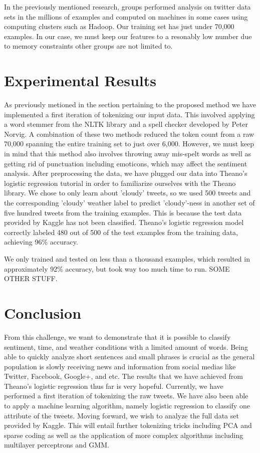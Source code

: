 \documentclass{article}
\begin{document}
In the previously mentioned research, groups performed analysis on twitter data sets in the millions of examples and computed on machines in some cases using computing clusters such as Hadoop. Our training set has just under 70,000 examples. In our case, we must keep our features to a resonably low number due to memory constraints other groups are not limited to.

\section{Experimental Results}

As previously metioned in the section pertaining to the proposed method we have implemented a first iteration of tokenizing our input data. This involved applying a word stemmer from the NLTK library and a spell checker developed by Peter Norvig. A combination of these two methods reduced the token count from a raw 70,000 spanning the entire training set to just over 6,000. However, we must keep in mind that this method also involves throwing away mis-spelt words as well as getting rid of punctuation including emoticons, which may affect the sentiment analysis. After preprocessing the data, we have plugged our data into Theano's logistic regression tutorial in order to familiarize ourselves with the Theano library. We chose to only learn about 'cloudy' tweets, so we used 500 tweets and the corresponding 'cloudy' weather label to predict 'cloudy'-ness in another set of five hundred tweets from the training examples. This is because the test data provided by Kaggle has not been classified. Theano's logistic regression model correctly labeled 480 out of 500 of the test examples from the training data, achieving 96\% accuracy.

We only trained and tested on less than a thousand examples, which resulted in approximately 92\% accuracy, but took way too much time to run. SOME OTHER STUFF.

\section{Conclusion}
From this challenge, we want to demonstrate that it is possible to classify sentiment, time, and weather conditions with a limited amount of words. Being able to quickly analyze short sentences and small phrases is crucial as the general population is slowly receiving news and information from social medias like Twitter, Facebook, Google+, and etc. The results that we have achieved from Theano's logistic regression thus far is very hopeful. Currently, we have performed a first iteration of tokenizing the raw tweets. We have also been able to apply a machine learning algorithm, namely logistic regression to classify one attribute of the tweets. Moving forward, we wish to analyze the full data set provided by Kaggle. This will entail further tokenizing tricks including PCA and sparse coding as well as the application of more complex algorithms including multilayer perceptrons and GMM.
\end{document}
